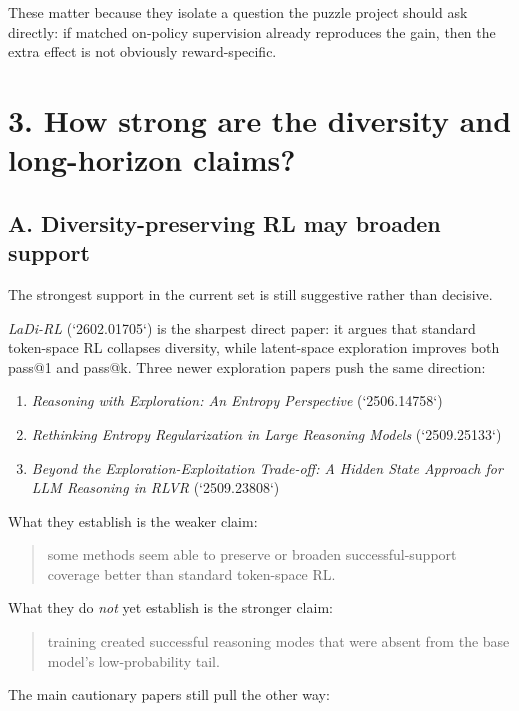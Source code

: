 \documentclass[11pt]{article}
\begin{document}
These matter because they isolate a question the puzzle project should ask directly: if matched on-policy supervision already reproduces the gain, then the extra effect is not obviously reward-specific.

\section*{3. How strong are the diversity and long-horizon claims?}

\subsection*{A. Diversity-preserving RL may broaden support}

The strongest support in the current set is still suggestive rather than decisive.

\emph{LaDi-RL} (`2602.01705`) is the sharpest direct paper: it argues that standard token-space RL collapses diversity, while latent-space exploration improves both pass@1 and pass@k. Three newer exploration papers push the same direction:

\begin{enumerate}
\item \emph{Reasoning with Exploration: An Entropy Perspective} (`2506.14758`)
\item \emph{Rethinking Entropy Regularization in Large Reasoning Models} (`2509.25133`)
\item \emph{Beyond the Exploration-Exploitation Trade-off: A Hidden State Approach for LLM Reasoning in RLVR} (`2509.23808`)
\end{enumerate}

What they establish is the weaker claim:

\begin{quote}
some methods seem able to preserve or broaden successful-support coverage better than standard token-space RL.
\end{quote}

What they do \emph{not} yet establish is the stronger claim:

\begin{quote}
training created successful reasoning modes that were absent from the base model's low-probability tail.
\end{quote}

The main cautionary papers still pull the other way:
\end{document}
